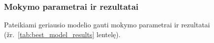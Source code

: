 \subsubsection{Mokymo parametrai ir rezultatai}
\label{subsubsec:mokymo_parametrai_ir_rezultatai}

Pateikiami geriausio modelio gauti mokymo parametrai ir rezultatai (žr.~\ref{tab:best_model_results} lentelę).

